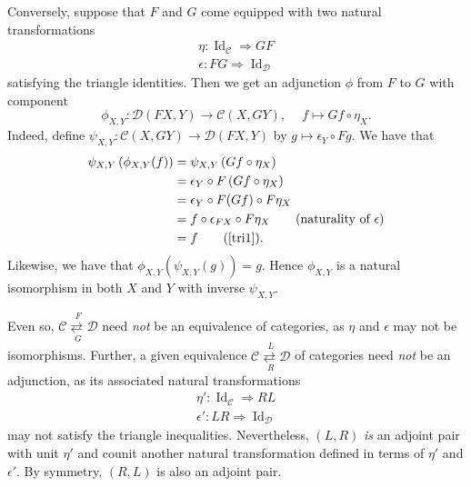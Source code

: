 \documentclass[10pt,letterpaper,cm]{nupset}
\theoremstyle{definition}
\theoremstyle{theorem}
\theoremstyle{remark}
\newcommand{\1}{\mathbf{1}}
\renewcommand{\c}{\mathscr{C}}
\renewcommand{\d}{\mathscr{D}}
\newcommand{\0}{\vec 0}
\DeclareMathOperator{\id}{Id}
\begin{document}
Conversely, suppose that $F$ and $G$ come equipped with two natural transformations
\begin{gather*}
\eta: \id_{\c} \Rightarrow GF
\\ \epsilon: FG \Rightarrow \id_{\d}
\end{gather*}
satisfying the triangle identities. Then we get an adjunction $\phi$ from $F$ to $G$ with component 
\[
\phi_{X, Y} : \d(F{X}, Y) \to \c(X, G{Y}), \ \quad f \mapsto G{f} \circ \eta_X.
\] 
Indeed, define $\psi_{X,Y} : \c(X, G{Y})\to  \d(F{X}, Y)$ by $g\mapsto \epsilon_Y \circ F{g}$. We have that 
\begin{align*}
\psi_{X,Y}\left(\phi_{X,Y}(f)\right) & = \psi_{X,Y}\left(G{f} \circ \eta_X\right)
\\ & = \epsilon_{Y} \circ F\left(G{f} \circ \eta_X\right)
\\ & = \epsilon_{Y} \circ F(G{f}) \circ F{\eta_X}
\\ & = f\circ \epsilon_{F{X}}\circ F{\eta_X} \tag{naturality of $\epsilon$}
\\ & =  f \tag{\eqref{tri1}}.
\end{align*}
Likewise, we have that $\phi_{X,Y}\left(\psi_{X,Y}(g)\right) = g$. Hence  $\phi_{X,Y}$ is a natural isomorphism in both $X$ and $Y$ with inverse $\psi_{X,Y}$.


\smallskip

Even so,  $\overset{F}{\underset{G}{\c \rightleftarrows \d}}$ need \emph{not} be an equivalence of categories, as $\eta$ and $\epsilon$ may not be isomorphisms. Further, a given equivalence $\overset{L}{\underset{R}{\c \rightleftarrows \d}}$ of categories need \emph{not} be an adjunction, as its associated natural transformations
\begin{gather*}
\eta': \id_{\c} \Rightarrow RL
\\ \epsilon': LR \Rightarrow \id_{\d}
\end{gather*}
may not satisfy the triangle inequalities. Nevertheless, $\left(L, R\right)$ \emph{is} an adjoint pair with unit $\eta'$ and counit another natural transformation defined in terms of $\eta'$ and $\epsilon'$. By symmetry, $\left(R, L\right)$ is also an adjoint pair.

\smallskip
\end{document}

